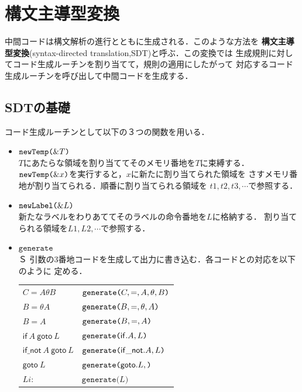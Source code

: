 \documentclass[dvipdfmx,a4j]{jbook}
\begin{document}
\section{構文主導型変換}

中間コードは構文解析の進行とともに生成される．このような方法を
{\bf 構文主導型変換}(syntax-directed translation,SDT)と呼ぶ．この変換では
生成規則に対してコード生成ルーチンを割り当てて，規則の適用にしたがって
対応するコード生成ルーチンを呼び出して中間コードを生成する．

\subsection{SDTの基礎}

コード生成ルーチンとして以下の３つの関数を用いる．
\begin{itemize}
  \item $\texttt{newTemp(}\& T\texttt{)}$\\
  $T$にあたらな領域を割り当ててそのメモリ番地を$T$に束縛する．
  $\texttt{newTemp(}\& x\texttt{)}$を実行すると，$x$に新たに割り当てられた領域を
  さすメモリ番地が割り当てられる．順番に割り当てられる領域を
  $t1,t2,t3,\cdots$で参照する．
  \item $\texttt{newLabel(}\& L\texttt{)}$\\
  新たなラベルをわりあててそのラベルの命令番地を$L$に格納する．
  割り当てられる領域を$L1,L2,\cdots$で参照する．
  \item $\texttt{generate}$\\Ｓ
  引数の3番地コードを生成して出力に書き込む．各コードとの対応を以下のように
  定める．

  
  \begin{center}
  \begin{tabular}{ll}
  $C=A\theta B$ & $\texttt{generate(}{C},=,{A},{\theta},{B}\texttt{)}$\\
  $B=\theta A$ & $\texttt{generate(}{B},=,{\theta},{A}\texttt{)}$\\
  $B=A$ & $\texttt{generate(}{B},=,{A}\texttt{)}$\\
  $\mathsf{if}\ A\ \mathsf{goto}\ L$ & $\texttt{generate(}{\mathsf{if}}.{A},{L}\texttt{)}$\\
  $\mathsf{if\_not}\ A\ \mathsf{goto}\ L$ & $\texttt{generate(}{\mathsf{if\_not}}.{A},{L}\texttt{)}$\\
  $\mathsf{goto}\ L$ & $\texttt{generate(}{\mathsf{goto}}.{L},{}\texttt{)}$\\
  $Li: $ & $\texttt{generate(}L\texttt{)}$
  \end{tabular}
\end{center}
\end{itemize}
\end{document}
